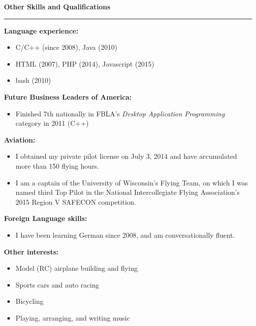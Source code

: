 \documentclass[12pt,letterpaper]{article}
\newenvironment{details}{
    \vspace{-1em}
    \begin{itemize}
        \renewcommand \labelitemi{\labelitemiv}
        \setlength{\itemsep}{0pt}
        \setlength{\parskip}{-1pt}
        \setlength{\parsep}{0pt}
    }{
    \end{itemize}
    \vspace{-.5em}
}
\newcommand{\hr} {
    \vspace{-1em}
    \par\rule{\textwidth}{1pt}
    \vspace{-1.5em}
}
\newcommand{\ressection}[1] {
    \par{\large \textbf{#1}}
    \hr
}
\newenvironment{other} {
    \ressection{Other Skills and Qualifications}
    \setlength{\parskip}{3pt}
}{
    \vspace{0.5em}
}
\begin{document}
\begin{other}
\par \textbf{Language experience:}
\begin{details}
    \item C/C++ (since 2008), Java (2010)
    \item HTML (2007), PHP (2014), Javascript (2015)
    \item bash (2010)
\end{details}
\par \textbf{Future Business Leaders of America:}
\begin{details}
    \item Finished 7th nationally in FBLA's \textit{Desktop Application Programming} category in 2011 (C++)
\end{details}

\par \textbf{Aviation:}
\begin{details}
    \item I obtained my private pilot license on July 3, 2014 and have accumulated more than 150 flying hours.~
    \item I am a captain of the University of Wisconsin's Flying Team, on which I was named third Top Pilot in the National Intercollegiate Flying Association's 2015 Region V SAFECON competition.
\end{details}

\par \textbf{Foreign Language skills:}
\begin{details}
    \item I have been learning German since 2008, and am conversationally fluent.
\end{details}

\par \textbf{Other interests:}
\begin{details}
    \item Model (RC) airplane building and flying
    \item Sports cars and auto racing
    \item Bicycling
    \item Playing, arranging, and writing music
\end{details}

\end{other}
\end{document}
